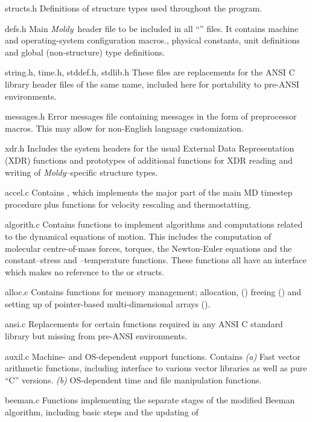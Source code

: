\documentclass[a4paper,twoside]{report}
\newcommand{\moldy}{\emph{Moldy}}
\begin{document}
\begin{Fndescription}
\item[structs.h] Definitions of structure types used throughout the
  program.
\item[defs.h] Main \moldy\ header file to be included in all
  ``'' files.  It contains machine and operating-system
  configuration macros., physical constants, unit definitions and
  global (non-structure) type definitions.
\item[string.h, time.h, stddef.h, stdlib.h] These files are
  replacements for the ANSI C library header files of the same name,
  included here for portability to pre-ANSI environments.
\item[messages.h] Error messages file containing messages in the form
  of preprocessor macros. This may allow for non-English language
  customization. 
\item[xdr.h] Includes the system headers for the usual External Data
  Representation (XDR) functions and prototypes of additional
  functions for XDR reading and writing of \moldy--specific structure
  types.
\item[accel.c] Contains , which implements the
  major part of the main MD timestep procedure plus functions for
  velocity rescaling and thermostatting.
\item[algorith.c] Contains functions to implement algorithms and
  computations related to the dynamical equations of motion. This
  includes the computation of molecular centre-of-mass forces,
  torques, the Newton-Euler equations and the constant--stress and
  --temperature functions.  These functions all have an
  interface which makes no reference to the  or
   structs.
\item[alloc.c] Contains functions for memory management; allocation,
  () freeing () and setting up of
  pointer-based multi-dimensional arrays ().
\item[ansi.c] Replacements for certain functions required in any ANSI
  C standard library but missing from pre-ANSI environments.
\item[auxil.c] Machine- and OS-dependent support functions. Contains
  \emph{(a)} Fast vector arithmetic functions, including interface to
  various vector libraries as well as pure ``C'' versions. \emph{(b)}
  OS-dependent time and file manipulation functions.
\item[beeman.c] Functions implementing the separate stages of the
  modified Beeman algorithm, including basic steps and the updating of

\end{Fndescription}
\end{document}
